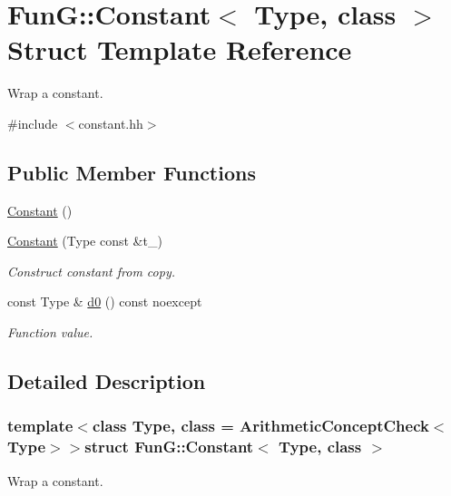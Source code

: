 \hypertarget{structFunG_1_1Constant}{\section{\-Fun\-G\-:\-:\-Constant$<$ \-Type, class $>$ \-Struct \-Template \-Reference}
\label{structFunG_1_1Constant}
}


\-Wrap a constant.  




{\ttfamily \#include $<$constant.\-hh$>$}

\subsection*{\-Public \-Member \-Functions}
\begin{DoxyCompactItemize}
\item 
\hyperlink{structFunG_1_1Constant_acdf7efa985ead5b902ec094aaaaef0b8}{\-Constant} ()
\item 
\hyperlink{structFunG_1_1Constant_a310783597f488e554de12627bf56aec8}{\-Constant} (\-Type const \&t\-\_\-)
\begin{DoxyCompactList}\small\item\em \-Construct constant from copy. \end{DoxyCompactList}\item 
const \-Type \& \hyperlink{structFunG_1_1Constant_aad514a9470fbe1c47c0f07da6e160416}{d0} () const noexcept
\begin{DoxyCompactList}\small\item\em \-Function value. \end{DoxyCompactList}\end{DoxyCompactItemize}


\subsection{\-Detailed \-Description}
\subsubsection*{template$<$class Type, class = \-Arithmetic\-Concept\-Check$<$\-Type$>$$>$struct Fun\-G\-::\-Constant$<$ Type, class $>$}

\-Wrap a constant. 


